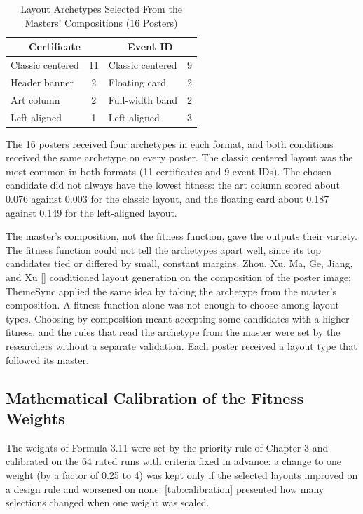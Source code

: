 \begin{refsection}
\begin{table}[!ht]
\centering
\caption{Layout Archetypes Selected From the Masters' Compositions (16 Posters)}
\label{tab:archetypes}
\begin{tabular}{l c l c}
\hline
\multicolumn{2}{c}{\textbf{Certificate}} & \multicolumn{2}{c}{\textbf{Event ID}} \\ \hline
Classic centered & 11 & Classic centered & 9 \\
Header banner & 2 & Floating card & 2 \\
Art column & 2 & Full-width band & 2 \\
Left-aligned & 1 & Left-aligned & 3 \\ \hline
\end{tabular}
\end{table}

The 16 posters received four archetypes in each format, and both conditions received the same archetype on every poster. The classic centered layout was the most common in both formats (11 certificates and 9 event IDs). The chosen candidate did not always have the lowest fitness: the art column scored about 0.076 against 0.003 for the classic layout, and the floating card about 0.187 against 0.149 for the left-aligned layout.

The master's composition, not the fitness function, gave the outputs their variety. The fitness function could not tell the archetypes apart well, since its top candidates tied or differed by small, constant margins. Zhou, Xu, Ma, Ge, Jiang, and Xu [\citeyear{zhou2022cglgan}] conditioned layout generation on the composition of the poster image; ThemeSync applied the same idea by taking the archetype from the master's composition. A fitness function alone was not enough to choose among layout types. Choosing by composition meant accepting some candidates with a higher fitness, and the rules that read the archetype from the master were set by the researchers without a separate validation. Each poster received a layout type that followed its master.

\clearpage
\subsection{Mathematical Calibration of the Fitness Weights}

The weights of Formula 3.11 were set by the priority rule of Chapter 3 and calibrated on the 64 rated runs with criteria fixed in advance: a change to one weight (by a factor of 0.25 to 4) was kept only if the selected layouts improved on a design rule and worsened on none. \ref{tab:calibration} presented how many selections changed when one weight was scaled.


\end{refsection}

